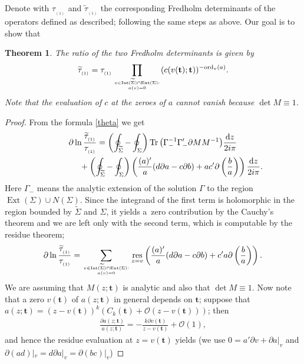 \documentclass[pdftex]{sigma}
\numberwithin{equation}{section}
\newtheorem{Theorem}{Theorem}[section]
\def \res#1{\mathop {\mathrm{res}}_{#1}}
\def\wt{\widetilde}
\def \G{\Gamma}
\def \pa{\partial}
\def\d{\mathrm d}
\def \t{\mathbf t}
\begin{document}
Denote with $\tau_{_{(1)}}$ and $\wt \tau_{_{(1)}}$ the corresponding Fredholm determinants of the operators def\/ined as described; following the same steps as above. Our goal is to show that
\begin{Theorem}
The ratio of the two Fredholm determinants is given by
\begin{gather*}
\wt \tau_{_{(1)}}={ \tau_{_{(1)}}} \prod_{v \in \operatorname{Int}(\wt \Sigma) \cap \operatorname{Ext}(\Sigma):\atop a(v)=0 } (c(v(\t);\t) )^{-{{\rm ord}}_{v}(a)}.
\end{gather*}
Note that the evaluation of $c$ at the zeroes of $a$ cannot vanish because $\det M \equiv 1$.
\end{Theorem}

\begin{proof} From the formula \eqref{theta} we get
\begin{gather*}
\pa \ln \frac { \wt \tau_{_{(1)}}}{ \tau_{_{(1)}}}
 = \left(\oint_{\wt \Sigma} - \oint_{\Sigma}\right) \operatorname{Tr} \big(\G_-^{-1} \G_-' \pa M M^{-1} \big) \frac {\d z}{2i\pi}\\
\hphantom{\pa \ln \frac { \wt \tau_{_{(1)}}}{ \tau_{_{(1)}}}=}{} +
 \left(\oint_{\wt \Sigma} - \oint_{\Sigma}\right) \left( \frac {(a)'}{a}(d \pa a - c \pa b )+ { ac'} \pa \left(\frac b a \right)\right)\frac {\d z}{2i\pi}.
\end{gather*}
Here $\G_-$ means the analytic extension of the solution $\G$ to the region $\operatorname{Ext}(\Sigma) \cup N(\Sigma)$. Since the integrand of the f\/irst term is holomorphic in the region bounded by $\wt \Sigma $ and $\Sigma$, it yields a~zero contribution by the Cauchy's theorem and we are left only with the second term, which is computable by the residue theorem;
\begin{gather*}
\pa \ln \frac { \wt \tau_{_{(1)}}}{ \tau_{_{(1)}}} =
\sum_{v \in \operatorname{Int}(\wt \Sigma) \cap \operatorname{Ext}(\Sigma):\atop a(v)=0 } \res{z=v}\left(
 \frac {(a)'}{a}(d \pa a - c \pa b ) + {c'}a \pa \left(\frac b a \right)\right).
\end{gather*}
We are assuming that $M(z;\t)$ is analytic and also that $\det M \equiv 1$.
Now note that a zero $v(\t)$ of $a(z;\t)$ in general depends on $\t$; suppose that $a(z;\t) = (z-v(\t))^k (C_k(\t) + \mathcal O(z-v(\t)))$; then
\begin{gather*}
\frac {\pa a(z;\t)}{a(z;\t)} =- \frac {k\pa v(\t)}{z-v(\t)} + \mathcal O(1),
\end{gather*}
and hence the residue evaluation at $z=v(\t)$ yields (we use $0 = a'\pa v + \pa a|_v$ and $\pa (ad)|_v = d \pa a|_v = \pa(bc)|_v$)

\end{proof}
\end{document}
